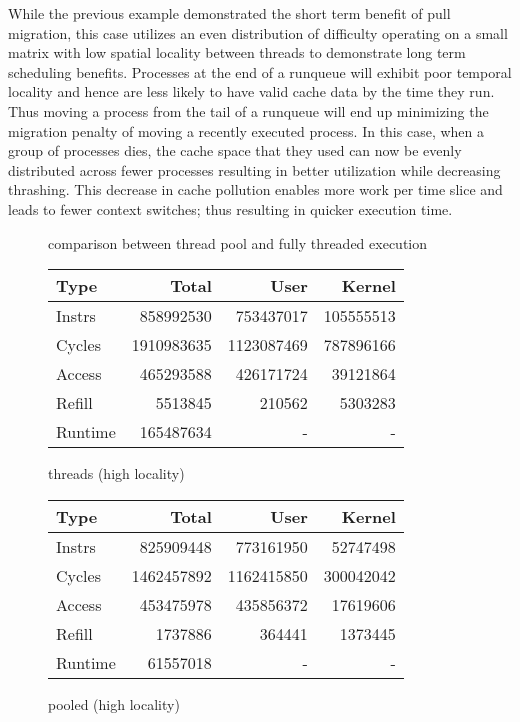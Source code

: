 \documentclass[11pt]{article}
\begin{document}
While the previous example demonstrated the short term benefit of pull migration, this case utilizes an even distribution of difficulty operating on a small matrix with low spatial locality between threads to demonstrate long term scheduling benefits.  Processes at the end of a runqueue will exhibit poor temporal locality and hence are less likely to have valid cache data by the time they run.  Thus moving a process from the tail of a runqueue will end up minimizing the migration penalty of moving a recently executed process.  In this case, when a group of processes dies, the cache space that they used can now be evenly distributed across fewer processes resulting in better utilization while decreasing thrashing.  This decrease in cache pollution enables more work per time slice and leads to fewer context switches; thus resulting in quicker execution time.

\begin{figure*}[!h]
	\caption{comparison between thread pool and fully threaded execution}
	\centering
	\begin{subtable}{.48\textwidth}
		\centering
		\begin{tabular}{ l|rrr }
			Type    & Total      & User       & Kernel    \\
			\hline
			Instrs & 858992530 & 753437017 & 105555513 \\ 
			Cycles & 1910983635 & 1123087469 & 787896166 \\ 
			Access & 465293588 & 426171724 & 39121864 \\ 
			Refill & 5513845 & 210562 & 5303283 \\ 
			Runtime & 165487634 & - & - \\ 
			\hline
		\end{tabular}
		\caption{threads (high locality)}
	\end{subtable}
	\hfill
	\begin{subtable}{.48\textwidth} 
		\centering
		\begin{tabular}{ l|rrr }
			Type    & Total      & User       & Kernel    \\
			\hline
			Instrs & 825909448 & 773161950 & 52747498 \\ 
			Cycles & 1462457892 & 1162415850 & 300042042 \\ 
			Access & 453475978 & 435856372 & 17619606 \\ 
			Refill & 1737886 & 364441 & 1373445 \\ 
			Runtime & 61557018 & - & - \\
			\hline
		\end{tabular}
		\caption{pooled (high locality)}        
	\end{subtable}
\end{figure*}
\end{document}
